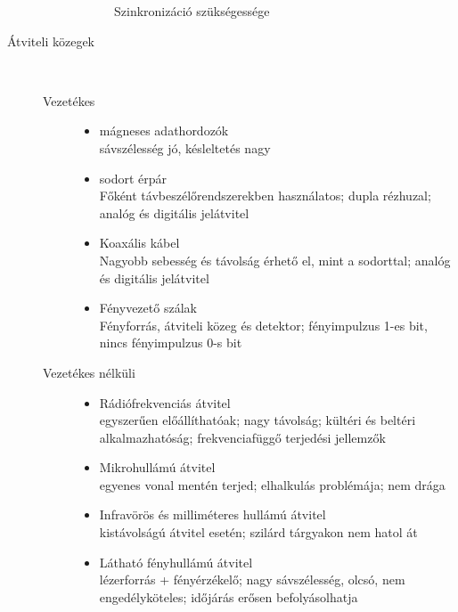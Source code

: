 \documentclass[margin=0px]{article}
\begin{document}
\begin{description}
\begin{description}
\begin{figure}[H]
                    \caption{Szinkronizáció szükségessége}
                \end{figure}
        \end{description}
    \item[Átviteli közegek] \hfill \\
        \begin{description}
            \item[Vezetékes] \hfill
                \begin{itemize}
                    \item mágneses adathordozók \\
                          sávszélesség jó, késleltetés nagy
                    \item sodort érpár \\
                          Főként távbeszélőrendszerekben használatos; dupla rézhuzal; analóg és digitális jelátvitel
                    \item Koaxális kábel\\
                          Nagyobb sebesség és távolság érhető el, mint a sodorttal; analóg és
                          digitális jelátvitel
                    \item Fényvezető szálak\\
                          Fényforrás, átviteli közeg és detektor; fényimpulzus 1-es bit, nincs
                          fényimpulzus 0-s bit
                \end{itemize}
            \item[Vezetékes nélküli] \hfill
                \begin{itemize}
                    \item Rádiófrekvenciás átvitel \\
                          egyszerűen előállíthatóak; nagy távolság; kültéri és beltéri alkalmazhatóság; frekvenciafüggő terjedési jellemzők
                    \item Mikrohullámú átvitel\\
                          egyenes vonal mentén terjed; elhalkulás problémája; nem drága
                    \item Infravörös és milliméteres hullámú átvitel \\
                          kistávolságú átvitel esetén; szilárd tárgyakon nem hatol át
                    \item Látható fényhullámú átvitel\\
                          lézerforrás + fényérzékelő; nagy sávszélesség, olcsó, nem engedélyköteles; időjárás erősen befolyásolhatja

\end{itemize}
\end{description}
\end{description}
\end{document}
